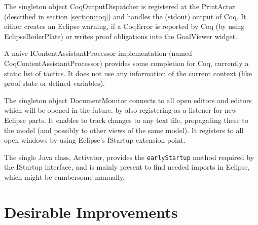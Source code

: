 \documentclass{article}
\begin{document}
The singleton object CoqOutputDispatcher is registered at the PrintActor (described in section \ref{section:coq}) and handles the (stdout) output of Coq. It either creates an Eclipse warning, if a CoqError is reported by Coq (by using EclipseBoilerPlate) or writes proof obligations into the GoalViewer widget.

A naive IContentAssistantProcessor implementation (named CoqContentAssistantProcessor) provides some completion for Coq, currently a static list of tactics. It does not use any information of the current context (like proof state or defined variables).

The singleton object DocumentMonitor connects to all open editors and editors which will be opened in the future, by also registering as a listener for new Eclipse parts. It enables to track changes to any text file, propagating these to the model (and possibly to other views of the same model). It registers to all open windows by using Eclipse's IStartup extension point.

The single Java class, Activator, provides the \texttt{earlyStartup} method required by the IStartup interface, and is mainly present to find needed imports in Eclipse, which might be cumbersome manually.

\section{Desirable Improvements} \label{section:improvements}
\end{document}
